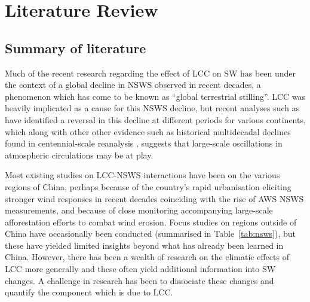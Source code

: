 \chapter{Literature Review}
\label{ch:litreview}






\section{Summary of literature}

Much of the recent research regarding the effect of \ac{LCC} on \ac{SW} has been under the context of a global decline in \ac{NSWS} observed in recent decades, a phenomenon which has come to be known as “global terrestrial stilling”. \ac{LCC} was heavily implicated as a cause for this \ac{NSWS} decline, but recent analyses such as \citep{zeng2019} have identified a reversal in this decline at different periods for various continents, which along with other other evidence such as historical multidecadal declines found in centennial-scale reanalysis \citep{shen2021}, suggests that large-scale oscillations in atmospheric circulations may be at play.

Most existing studies on \ac{LCC}-\ac{NSWS} interactions have been on the various regions of China, perhaps because of the country’s rapid urbanisation eliciting stronger wind responses in recent decades coinciding with the rise of \ac{AWS} \ac{NSWS} measurements, and because of close monitoring accompanying large-scale afforestation efforts to combat wind erosion. Focus studies on regions outside of China have occasionally been conducted (summarised in Table~\ref{tab:nsws}), but these have yielded limited insights beyond what has already been learned in China. However, there has been a wealth of research on the climatic effects of \ac{LCC} more generally and these often yield additional information into \ac{SW} changes. A challenge in research has been to dissociate these changes and quantify the component which is due to \ac{LCC}.


